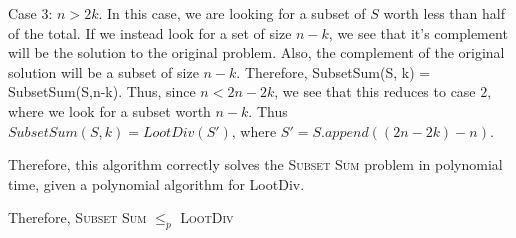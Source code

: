 \documentclass{article}
\begin{document}
Case 3: $n > 2k$.  In this case, we are looking for a subset of $S$ worth less than half of the total.  If we instead look for a set of size $n - k$, we see that it's complement will be the solution to the original problem.  Also, the complement of the original solution will be a subset of size $n-k$.  Therefore, SubsetSum(S, k) = SubsetSum(S,n-k).  Thus, since $n < 2n - 2k$, we see that this reduces to case $2$, where we look for a subset worth $n-k$.  Thus $SubsetSum(S, k) = LootDiv(S')$, where $S' = S.append((2n - 2k) - n)$.

Therefore, this algorithm correctly solves the \textsc{Subset Sum} problem in polynomial time, given a polynomial algorithm for LootDiv.  

Therefore, \textsc{Subset Sum} $\leq_p$  \textsc{LootDiv} 
\end{document}
